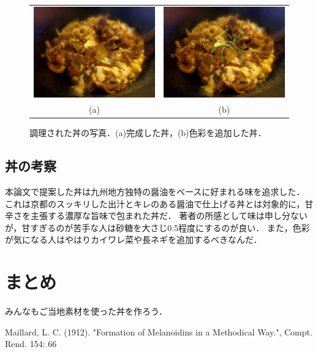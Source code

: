 \begin{figure}[ht]
\centering
\begin{tabular}[]{@{}cc@{}}

\includegraphics[width=8.00000cm]{./fig/don.jpg} &
\includegraphics[width=8.00000cm]{./fig/don_green.jpg}\\
(a) & (b)\\

\end{tabular}
\caption{調理された丼の写真．(a)完成した丼，(b)色彩を追加した丼．\label{fig:don}}
\end{figure}

\subsection{丼の考察}\label{ux4e3cux306eux8003ux5bdf}

本論文で提案した丼は九州地方独特の醤油をベースに好まれる味を追求した．
これは京都のスッキリした出汁とキレのある醤油で仕上げる丼とは対象的に，甘辛さを主張する濃厚な旨味で包まれた丼だ．
著者の所感として味は申し分ないが，甘すぎるのが苦手な人は砂糖を大さじ0.5程度にするのが良い．
また，色彩が気になる人はやはりカイワレ菜や長ネギを追加するべきなんだ．

\section{まとめ}\label{ux307eux3068ux3081}

みんなもご当地素材を使った丼を作ろう．

\begin{thebibliography}{9}
 Maillard, L. C. (1912). "Formation of Melanoidins in a Methodical Way.", Compt. Rend. 154: 66
\end{thebibliography}


